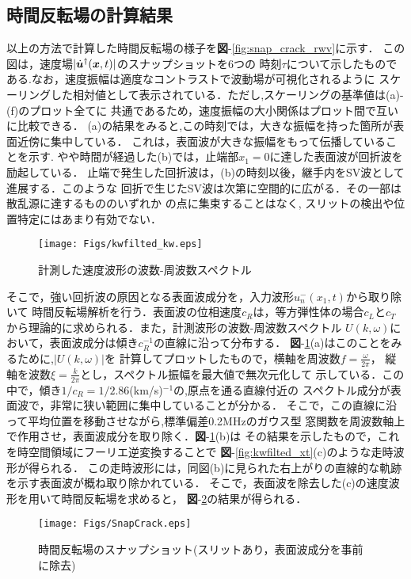 \subsection{時間反転場の計算結果}
以上の方法で計算した時間反転場の様子を{\bf 図}-\ref{fig:snap_crack_rwv}に示す．
この図は，速度場$| \dot{\boldsymbol{u}}^{\dagger}(\boldsymbol{x},t)|$のスナップショットを6つの
時刻$\tau$について示したものである.なお，速度振幅は適度なコントラストで波動場が可視化されるように
スケーリングした相対値として表示されている．ただし,スケーリングの基準値は(a)-(f)のプロット全てに
共通であるため，速度振幅の大小関係はプロット間で互いに比較できる．
(a)の結果をみると,この時刻では，大きな振幅を持った箇所が表面近傍に集中している．
これは，表面波が大きな振幅をもって伝播していることを示す.
やや時間が経過した(b)では，止端部$x_1=0$に達した表面波が回折波を励起している．
止端で発生した回折波は，(b)の時刻以後，継手内をSV波として進展する．このような
回折で生じたSV波は次第に空間的に広がる．その一部は散乱源に達するもののいずれか
の点に集束することはなく, スリットの検出や位置特定にはあまり有効でない．
\begin{figure}[t]
\centering
	\texttt{[image: Figs/kwfilted\_kw.eps]}
	\caption{計測した速度波形の波数-周波数スペクトル}
	\label{fig:kwfilted_kw}
\end{figure}
%
そこで，強い回折波の原因となる表面波成分を，入力波形$u_n^{-}(x_1,t)$から取り除いて
時間反転場解析を行う．表面波の位相速度$c_R$は，等方弾性体の場合$c_L$と$c_T$
から理論的に求められる\cite{Schmerr1999}．また，計測波形の波数-周波数スペクトル
$U(k,\omega)$において，表面波成分は傾き$c_R^{-1}$の直線に沿って分布する．
{\bf 図}-\ref{fig:kwfilted_kw}(a)はこのことをみるために,$|U(k,\omega)|$を
計算してプロットしたもので，横軸を周波数$f=\frac{\omega}{2\pi}$，
縦軸を波数$\xi=\frac{k}{2\pi}$とし，スペクトル振幅を最大値で無次元化して
示している．この中で，傾き$1/c_R=1/2.86$(km/s)$^{-1}$の,原点を通る直線付近の
スペクトル成分が表面波で，非常に狭い範囲に集中していることが分かる．
そこで，この直線に沿って平均位置を移動させながら,標準偏差0.2MHzのガウス型
窓関数を周波数軸上で作用させ，表面波成分を取り除く．{\bf 図}-\ref{fig:kwfilted_kw}(b)は
その結果を示したもので，これを時空間領域にフーリエ逆変換することで
{\bf 図}-\ref{fig:kwfilted_xt}(c)のような走時波形が得られる．
この走時波形には，同図(b)に見られた右上がりの直線的な軌跡を示す表面波が概ね取り除かれている．
そこで，表面波を除去した(c)の速度波形を用いて時間反転場を求めると，
{\bf 図}-\ref{fig:snap_crack}の結果が得られる．
\begin{figure}[thb]
\centering
	\texttt{[image: Figs/SnapCrack.eps]}
	\caption{時間反転場のスナップショット(スリットあり，表面波成分を事前に除去)}
	\label{fig:snap_crack}
\end{figure}
